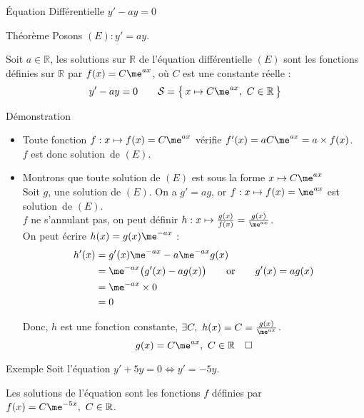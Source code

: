 \documentclass{cours}
\begin{document}
    \begin{Gpartie}{Équation Différentielle $y'-ay=0$} 
        \begin{Spartie}{Théorème} 
            Posons $(E) : y'=ay$.

            Soit $a\in\mathbb{R}$, les solutions sur $\mathbb{R}$ de l'équation différentielle $(E)$ sont les fonctions définies sur $\mathbb{R}$ par $f(x)=C\me^{ax}$, où $C$ est une constante réelle :
            \[y'-ay=0\qquad\mathcal{S}=\big\{\,x\mapsto C\me^{ax},~C\in\mathbb{R}\,\big\}\]

            \begin{SSpartie}{Démonstration} 
                \begin{itemize}
                    \item Toute fonction $f:x\mapsto f(x)=C\me^{ax}$ vérifie $f'(x)=aC\me^{ax}=a\times f(x)$. \\ $f$ est donc solution~de $(E)$.
                    \item Montrons que toute solution de $(E)$ est sous la forme $x\mapsto C\me^{ax}$ \\
                    Soit $g$, une solution de $(E)$. On a $g'=ag$, or $f:x\mapsto f(x)=\me^{ax}$ est solution~de $(E)$. \\
                    $f$ ne s'annulant pas, on peut définir $h:x\mapsto \frac{g(x)}{f(x)}=\frac{g(x)}{\me^{ax}}$. \\
                    On peut écrire $h(x)=g(x)\me^{-ax}$ :
                    \[\begin{aligned}[t]
                        h'(x)&=g'(x)\me^{-ax}-a\me^{-ax}g(x) \\
                        &=\me^{-ax}\big(g'(x)-ag(x)\big)\qquad\text{or}\qquad g'(x)=ag(x) \\
                        &=\me^{-ax}\times 0 \\
                        &=0
                    \end{aligned}\]

                    Donc, $h$ est une fonction constante, $\exists C,~h(x)=C=\frac{g(x)}{\me^{ax}}$.
                    \[g(x)=C\me^{ax},~C\in\mathbb{R}\quad\square\]
                \end{itemize}
            \end{SSpartie}
            \begin{Spartie}{Exemple} 
                Soit l'équation $y'+5y=0\iff y'=-5y$.

                Les solutions de l'équation sont les fonctions $f$ définies par $f(x)=C\me^{-5x},\ C\in\mathbb{R}$.
            \end{Spartie}
        \end{Spartie}
    \end{Gpartie}
\end{document}
